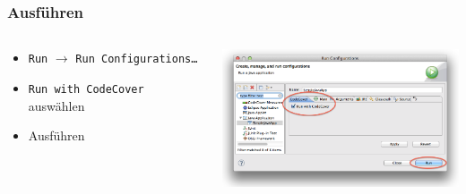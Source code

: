 \documentclass{beamer}
\begin{document}
  \begin{frame}
    \frametitle{Ausführen}
    \begin{columns}
      \begin{column}{4cm}
        \begin{itemize}
          \item \texttt{Run} $\rightarrow$ \texttt{Run Configurations\dots}
          \item \texttt{Run with CodeCover} auswählen
          \item Ausführen
        \end{itemize}
        \vspace{2cm}
      \end{column}
      \begin{column}{6cm}
        \begin{overprint}
          \includegraphics[width=7cm]{pictures/runconfigurations.png}
        \end{overprint}
      \end{column}
    \end{columns}
  \end{frame}
\end{document}

